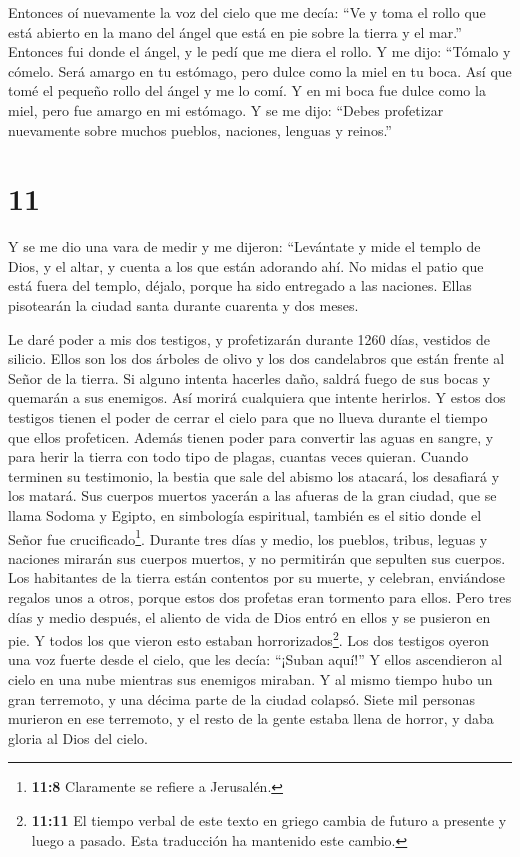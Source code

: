  Entonces oí nuevamente la voz del cielo que me decía: ``Ve
y toma el rollo que está abierto en la mano del ángel que está en pie
sobre la tierra y el mar.''  Entonces fui donde el ángel, y
le pedí que me diera el rollo. Y me dijo: ``Tómalo y cómelo. Será amargo
en tu estómago, pero dulce como la miel en tu boca.  Así
que tomé el pequeño rollo del ángel y me lo comí. Y en mi boca fue dulce
como la miel, pero fue amargo en mi estómago.  Y se me
dijo: ``Debes profetizar nuevamente sobre muchos pueblos, naciones,
lenguas y reinos.''

\hypertarget{section-10}{%
\section{11}\label{section-10}}

 Y se me dio una vara de medir y me dijeron: ``Levántate y
mide el templo de Dios, y el altar, y cuenta a los que están adorando
ahí.  No midas el patio que está fuera del templo, déjalo,
porque ha sido entregado a las naciones. Ellas pisotearán la ciudad
santa durante cuarenta y dos meses.

 Le daré poder a mis dos testigos, y profetizarán durante
1260 días, vestidos de silicio.  Ellos son los dos árboles
de olivo y los dos candelabros que están frente al Señor de la tierra.
 Si alguno intenta hacerles daño, saldrá fuego de sus bocas
y quemarán a sus enemigos. Así morirá cualquiera que intente herirlos.
 Y estos dos testigos tienen el poder de cerrar el cielo
para que no llueva durante el tiempo que ellos profeticen. Además tienen
poder para convertir las aguas en sangre, y para herir la tierra con
todo tipo de plagas, cuantas veces quieran.  Cuando terminen
su testimonio, la bestia que sale del abismo los atacará, los desafiará
y los matará.  Sus cuerpos muertos yacerán a las afueras de
la gran ciudad, que se llama Sodoma y Egipto, en simbología espiritual,
también es el sitio donde el Señor fue crucificado\footnote{\textbf{11:8}
  Claramente se refiere a Jerusalén.}.  Durante tres días y
medio, los pueblos, tribus, leguas y naciones mirarán sus cuerpos
muertos, y no permitirán que sepulten sus cuerpos.  Los
habitantes de la tierra están contentos por su muerte, y celebran,
enviándose regalos unos a otros, porque estos dos profetas eran tormento
para ellos.  Pero tres días y medio después, el aliento de
vida de Dios entró en ellos y se pusieron en pie. Y todos los que vieron
esto estaban horrorizados\footnote{\textbf{11:11} El tiempo verbal de
  este texto en griego cambia de futuro a presente y luego a pasado.
  Esta traducción ha mantenido este cambio.}.  Los dos
testigos oyeron una voz fuerte desde el cielo, que les decía: ``¡Suban
aquí!'' Y ellos ascendieron al cielo en una nube mientras sus enemigos
miraban.  Y al mismo tiempo hubo un gran terremoto, y una
décima parte de la ciudad colapsó. Siete mil personas murieron en ese
terremoto, y el resto de la gente estaba llena de horror, y daba gloria
al Dios del cielo.

